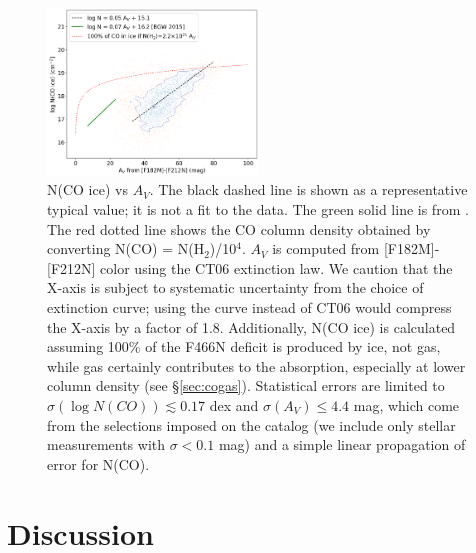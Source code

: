 \documentclass[times,astrosymb,twocolumn]{aastex631}
\def\rr#1{#1}
\begin{document}
\begin{figure}
    \centering
    \includegraphics[width=0.5\textwidth]{figures/NCO_vs_AV_182-212_contour.png} %
    \caption{N(CO ice) vs $A_V$.
    The black dashed line is shown as a representative typical value; it is not a fit to the data.
    The green \rr{solid} line is from \citet[][Figure 7]{Boogert2015}.
    The red \rr{dotted} line shows the CO column density obtained by converting N(CO) = N(H$_2$)/10$^4$.
     $A_V$ is computed from [F182M]-[F212N] color \rr{using the CT06 extinction law}.
     \rr{We caution that the X-axis is subject to systematic uncertainty from the choice of extinction curve; using the \citet{Fritz2011} curve instead of CT06 would compress the X-axis by a factor of 1.8.}
     \rr{Additionally, N(CO ice) is calculated assuming 100\% of the F466N deficit is produced by ice, not gas, while gas certainly contributes to the absorption, especially at lower column density (see \S \ref{sec:cogas}).}
     \rr{Statistical errors are limited to $\sigma(\log N(CO))\lesssim0.17$ dex and $\sigma(A_V)\leq4.4$ mag, which come from the selections imposed on the catalog (we include only stellar measurements with $\sigma<0.1$ mag) and a simple linear propagation of error for N(CO).}
    }
    \label{fig:ncovsav}
\end{figure}

\section{Discussion}
\label{sec:icegasdiscussion}
\end{document}

